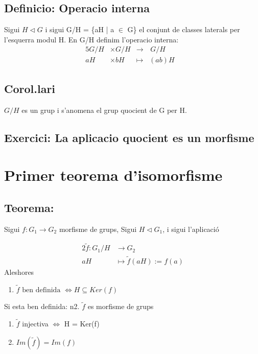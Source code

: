 \documentclass[11pt]{article}
\begin{document}
\subsection{Definicio: Operacio interna}
\label{sec:org66e0d8d}
Sigui \(H \vartriangleleft G\) i sigui G/H = \{aH | a \(\in\) G\} el conjunt de classes laterals per l'esquerra modul H. En G/H definim l'operacio interna:
\begin{alignat*}{5}
G/H &\times G/H &\to&\hspace{2pt}  G/H & \\
aH &\times bH &\mapsto&  (ab)H &
\end{alignat*}
\subsection{Corol.lari}
\label{sec:org77bd451}
\(G/H\) es un grup i s'anomena el grup quocient de G per H.
\subsection{Exercici: La aplicacio quocient es un morfisme}
\label{sec:org92e8893}

\section{Primer teorema d'isomorfisme}
\label{sec:org237e4eb}

\subsection{Teorema:}
\label{sec:org276f6ed}
Sigui \(f: G_1 \to G_2\) morfisme de grups, Sigui \(H \vartriangleleft G_1\), i sigui l'aplicació

\begin{alignat*}{2}
\tilde{f}: G_1/H &\to G_2 \\
aH &\mapsto \tilde{f}(aH) := f(a)
\end{alignat*}
Aleshores\\
\begin{enumerate}
\item \(\tilde{f}\text{ ben definida }\iff H \subseteq Ker(f)\)
\end{enumerate}
Si esta ben definida:
n2. \(\tilde{f}\) es morfisme de grups
\begin{enumerate}
\item \(\tilde{f}\) injectiva \(\iff\) H = Ker(f)
\item \(Im( \tilde{f} ) = Im(f)\)
\end{enumerate}
\end{document}
